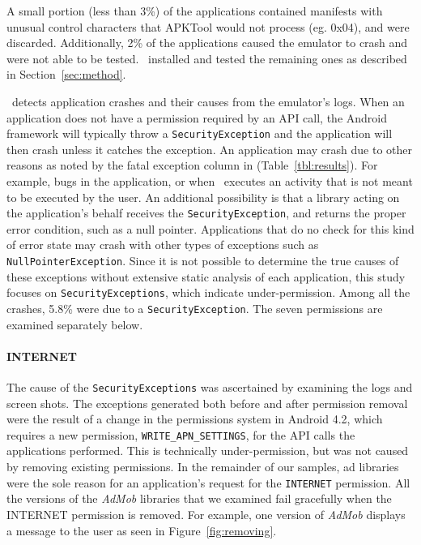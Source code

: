 A small portion (less than 3\%) of the applications contained manifests with unusual control characters that APKTool would not process (eg. 0x04), and were discarded.  Additionally, 2\% of the applications caused the emulator to crash and were not able to be tested. \toolname\ installed and tested the remaining ones as described in Section~\ref{sec:method}. 

\toolname\ detects application crashes and their causes from the emulator's logs.  When an application does not have a permission required by an API call, the Android framework will typically throw a \texttt{SecurityException} and the application will then crash unless it catches the exception.  An application may crash due to other reasons as noted by the fatal exception column in (Table~\ref{tbl:results}).  For example, bugs in the application, or when \toolname\ executes an activity that is not meant to be executed by the user.  An additional possibility is that a library acting on the application's behalf receives the \texttt{SecurityException}, and returns the proper error condition, such as a null pointer. Applications that do no check for this kind of error state may crash with other types of exceptions such as \texttt{NullPointerException}.  Since it is not possible to determine the true causes of these exceptions without extensive static analysis of each application, this study focuses on \texttt{SecurityExceptions}, which indicate under-permission.  Among all the crashes, 5.8\% were due to a \texttt{SecurityException}.  The seven permissions are examined separately below.

\paragraph{\bfseries \ttfamily INTERNET}
The cause of the \texttt{SecurityExceptions} was ascertained by examining the logs and screen shots.  The exceptions generated both before and after permission removal were the result of a change in the permissions system in Android 4.2, which requires a new permission, \texttt{WRITE\_APN\_SETTINGS}, for the API calls the applications performed.  This is technically under-permission, but was not caused by removing existing permissions.  In the remainder of our samples, ad libraries were the sole reason for an application's request for the \texttt{INTERNET} permission.  All the versions of the \textit{AdMob} libraries that we examined fail gracefully when the INTERNET permission is removed.  For example,  one version of \textit{AdMob} displays a message to the user as seen in Figure~\ref{fig:removing}. 

